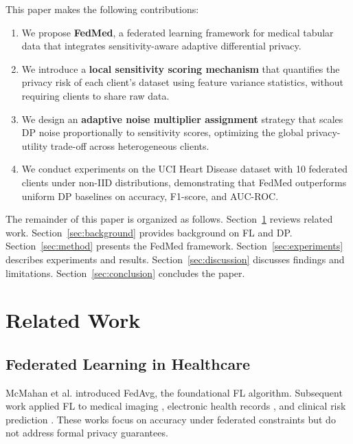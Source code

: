 \documentclass[journal]{IEEEtran}
\begin{document}
This paper makes the following contributions:
\begin{enumerate}
  \item We propose \textbf{FedMed}, a federated learning framework for medical
        tabular data that integrates sensitivity-aware adaptive differential
        privacy.
  \item We introduce a \textbf{local sensitivity scoring mechanism} that
        quantifies the privacy risk of each client's dataset using feature
        variance statistics, without requiring clients to share raw data.
  \item We design an \textbf{adaptive noise multiplier assignment} strategy
        that scales DP noise proportionally to sensitivity scores, optimizing
        the global privacy-utility trade-off across heterogeneous clients.
  \item We conduct experiments on the UCI Heart Disease dataset \cite{detrano1989}
        with 10 federated clients under non-IID distributions, demonstrating
        that FedMed outperforms uniform DP baselines on accuracy, F1-score,
        and AUC-ROC.
\end{enumerate}

The remainder of this paper is organized as follows.
Section~\ref{sec:related} reviews related work.
Section~\ref{sec:background} provides background on FL and DP.
Section~\ref{sec:method} presents the FedMed framework.
Section~\ref{sec:experiments} describes experiments and results.
Section~\ref{sec:discussion} discusses findings and limitations.
Section~\ref{sec:conclusion} concludes the paper.

\section{Related Work}
\label{sec:related}

\subsection{Federated Learning in Healthcare}
McMahan et al. \cite{mcmahan2017} introduced FedAvg, the foundational FL
algorithm. Subsequent work applied FL to medical imaging \cite{sheller2020},
electronic health records \cite{brisimi2018}, and clinical risk
prediction \cite{huang2019}. These works focus on accuracy under federated
constraints but do not address formal privacy guarantees.
\end{document}
